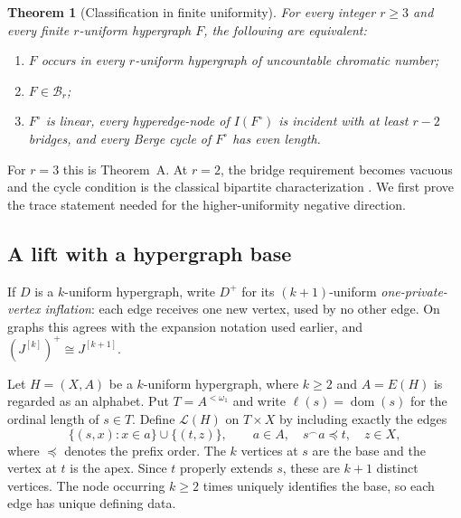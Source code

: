 \documentclass[a4paper,11pt,reqno]{amsart}
\theoremstyle{plain}
\newtheorem{theorem}{Theorem}[section]
\theoremstyle{definition}
\theoremstyle{remark}
\begin{document}
\begin{theorem}[Classification in finite uniformity]
\label{uniform-classification}
For every integer $r\ge3$ and every finite $r$-uniform hypergraph $F$, the
following are equivalent:
\begin{enumerate}
\item $F$ occurs in every $r$-uniform hypergraph of uncountable chromatic number;
\item $F\in\mathcal B_r$;
\item $F^\circ$ is linear, every hyperedge-node of $I(F^\circ)$ is incident
with at least $r-2$ bridges, and every Berge cycle of $F^\circ$ has even length.
\end{enumerate}
\end{theorem}

For $r=3$ this is Theorem~A.  At $r=2$, the bridge requirement becomes
vacuous and the cycle condition is the classical bipartite characterization
\citep{erdoshajnal1966}.  We first prove the trace statement needed for the
higher-uniformity negative direction.

\subsection{A lift with a hypergraph base}
\label{uniform-hypergraph-lift}

If $D$ is a $k$-uniform hypergraph, write $D^+$ for its
$(k+1)$-uniform \emph{one-private-vertex inflation}: each edge receives one
new vertex, used by no other edge.  On graphs this agrees with the expansion
notation used earlier, and $(J^{[k]})^+\cong J^{[k+1]}$.

Let $H=(X,A)$ be a $k$-uniform hypergraph, where $k\ge2$ and $A=E(H)$ is
regarded as an alphabet.  Put $T=A^{<\omega_1}$ and write
$\ell(s)=\operatorname{dom}(s)$ for the ordinal length of $s\in T$.
Define
$\mathcal L(H)$ on $T\times X$ by including exactly the edges
\begin{equation}\label{uniform-lift-edge}
 \{(s,x):x\in a\}\cup\{(t,z)\},
 \qquad a\in A,\quad s^\frown a\preccurlyeq t,\quad z\in X,
\end{equation}
where $\preccurlyeq$ denotes the prefix order.  The $k$ vertices at $s$ are
the base and the vertex at $t$ is the apex.  Since $t$ properly extends $s$,
these are $k+1$ distinct vertices.  The node occurring $k\ge2$ times
uniquely identifies the base, so each edge has unique defining data.
\end{document}
